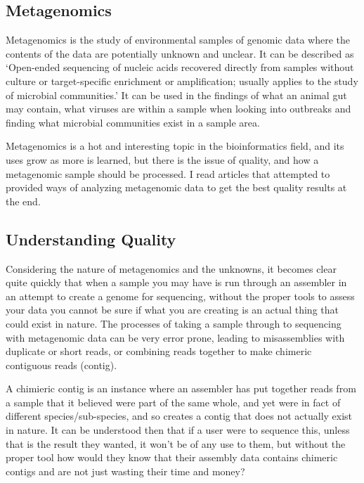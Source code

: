 \subsection{Metagenomics}
Metagenomics is the study of environmental samples of genomic data where the contents of the data are potentially unknown and unclear. It can be described as `Open-ended sequencing of nucleic acids recovered directly from samples without culture or target-specific enrichment or amplification; usually applies to the study of microbial communities.'\cite{citeulike:14021056} It can be used in the findings of what an animal gut may contain, what viruses are within a sample when looking into outbreaks and finding what microbial communities exist in a sample area.

Metagenomics is a hot and interesting topic in the bioinformatics field, and its uses grow as more is learned, but there is the issue of quality, and how a metagenomic sample should be processed. I read articles that attempted to provided ways of analyzing metagenomic data to get the best quality results at the end.\cite{citeulike:11448654}

\subsection{Understanding Quality}

Considering the nature of metagenomics and the unknowns, it becomes clear quite quickly that when a sample you may have is run through an assembler in an attempt to create a genome for sequencing, without the proper tools to assess your data you cannot be sure if what you are creating is an actual thing that could exist in nature. The processes of taking a sample through to sequencing with metagenomic data can be very error prone, leading to misassemblies with duplicate or short reads, or combining reads together to make chimeric contiguous reads (contig).\cite{citeulike:3746363}

A chimieric contig is an instance where an assembler has put together reads from a sample that it believed were part of the same whole, and yet were in fact of different species/sub-species, and so creates a contig that does not actually exist in nature. It can be understood then that if a user were to sequence this, unless that is the result they wanted, it won't be of any use to them, but without the proper tool how would they know that their assembly data contains chimeric contigs and are not just wasting their time and money?

